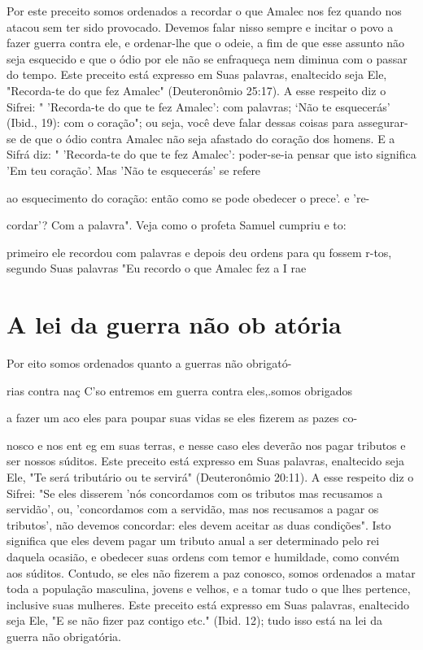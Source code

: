 \begin{itemize}
\begin{enumrate}
\begin{itemize}
\begin{itemize}
\begin{itemize}
Por este preceito somos ordenados a recordar o que Amalec nos fez quando
nos atacou sem ter sido provocado. Devemos falar nisso sempre e inci­tar
o povo a fazer guerra contra ele, e ordenar-lhe que o odeie, a fim de
que esse assunto não seja esquecido e que o ódio por ele não se
enfraqueça nem diminua com o passar do tempo. Este preceito está
expresso em Suas palavras, enaltecido seja Ele, "Recorda-te do que fez
Amalec" (Deuteronômio 25:17). A esse respeito diz o Sifrei: "
'Recorda-te do que te fez Amalec': com palavras; `Não te esquecerás'
(Ibid., 19): com o coração"; ou seja, você deve falar dessas coisas para
assegurar-se de que o ódio contra Amalec não seja afastado do cora­ção
dos homens. E a Sifrá diz: " 'Recorda-te do que te fez Amalec':
poder-se-ia pensar que isto significa 'Em teu coração'. Mas 'Não te
esquecerás' se refere

ao esquecimento do coração: então como se pode obedecer o prece'. e 're-

cordar'? Com a palavra". Veja como o profeta Samuel cumpriu e to:

primeiro ele recordou com palavras e depois deu ordens para qu fossem
r-tos, segundo Suas palavras "Eu recordo o que Amalec fez a I rae

\section{A lei da guerra não ob atória}

Por eito somos ordenados quanto a guerras não obrigató-

rias contra naç C'so entremos em guerra contra eles,.somos obrigados

a fazer um aco eles para poupar suas vidas se eles fizerem as pazes co-

nosco e nos ent eg em suas terras, e nesse caso eles deverão nos pagar
tribu­tos e ser nossos súditos. Este preceito está expresso em Suas
palavras, enalteci­do seja Ele, "Te será tributário ou te servirá"
(Deuteronômio 20:11). A esse res­peito diz o Sifrei: "Se eles disserem
'nós concordamos com os tributos mas re­cusamos a servidão', ou,
'concordamos com a servidão, mas nos recusamos a pagar os tributos', não
devemos concordar: eles devem aceitar as duas condi­ções". Isto
significa que eles devem pagar um tributo anual a ser determinado pelo
rei daquela ocasião, e obedecer suas ordens com temor e humildade, co­mo
convém aos súditos. Contudo, se eles não fizerem a paz conosco, somos
ordenados a matar toda a população masculina, jovens e velhos, e a tomar
tudo o que lhes pertence, inclusive suas mulheres. Este preceito está
expresso em Suas palavras, enaltecido seja Ele, "E se não fizer paz
contigo etc." (Ibid. 12); tudo isso está na lei da guerra não
obrigatória.


\end{itemize}
\end{itemize}
\end{itemize}
\end{enumrate}
\end{itemize}
